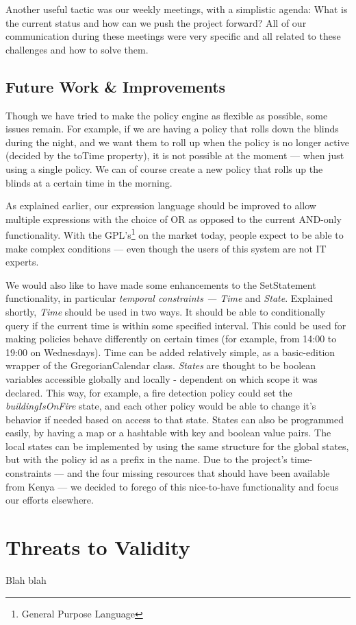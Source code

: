 Another useful tactic was our weekly meetings, with a simplistic agenda: What is the current status and how can we push the project forward? All of our communication during these meetings were very specific and all related to these challenges and how to solve them. 

\subsection{Future Work \& Improvements}\label{subsec:improvements}
Though we have tried to make the policy engine as flexible as possible, some issues remain. For example, if we are having a policy that rolls down the blinds during the night, and we want them to roll up when the policy is no longer active (decided by the toTime property), it is not possible at the moment --- when just using a single policy. We can of course create a new policy that rolls up the blinds at a certain time in the morning.

As explained earlier, our expression language should be improved to allow multiple expressions with the choice of OR as opposed to the current AND-only functionality. With the GPL's\footnote{General Purpose Language} on the market today, people expect to be able to make complex conditions --- even though the users of this system are not IT experts. 

We would also like to have made some enhancements to the SetStatement functionality, in particular \textit{temporal constraints --- Time} and \textit{State}. Explained shortly, \textit{Time} should be used in two ways. It should be able to conditionally query if the current time is within some specified interval. This could be used for making policies behave differently on certain times (for example, from 14:00 to 19:00 on Wednesdays). Time can be added relatively simple, as a basic-edition wrapper of the GregorianCalendar class. \textit{States} are thought to be boolean variables accessible globally and locally - dependent on which scope it was declared. This way, for example, a fire detection policy could set the \textit{buildingIsOnFire} state, and each other policy would be able to change it's behavior if needed based on access to that state. States can also be programmed easily, by having a map or a hashtable with key and boolean value pairs. The local states can be implemented by using the same structure for the global states, but with the policy id as a prefix in the name. Due to the project's time-constraints --- and the four missing resources that should have been available from Kenya --- we decided to forego of this nice-to-have functionality and focus our efforts elsewhere. 

\section{Threats to Validity}\label{subsec:threatstovalidity}
Blah blah